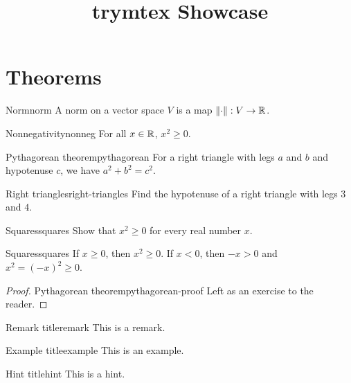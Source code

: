 \documentclass{article}
\title{trymtex Showcase}
\author{}
\date{}
\begin{document}
\maketitle
\tableofcontents

\section{Theorems}

\begin{definition}{Norm}{norm}
  A norm on a vector space \(V\) is a map \( \lVert\cdot\rVert : V \to \mathbb{R} \).
\end{definition}

\begin{lemma}{Nonnegativity}{nonneg}
  For all \( x \in \mathbb{R} \), \( x^2 \ge 0 \).
\end{lemma}

\begin{theorem}{Pythagorean theorem}{pythagorean}
  For a right triangle with legs \(a\) and \(b\) and hypotenuse \(c\), we have \( a^2 + b^2 = c^2 \).
\end{theorem}

\begin{problem}{Right triangles}{right-triangles}
  Find the hypotenuse of a right triangle with legs \(3\) and \(4\).
\end{problem}

\begin{exercise}{Squares}{squares}
  Show that \( x^2 \ge 0 \) for every real number \(x\).
\end{exercise}

\begin{solution}{Squares}{squares}
  If \(x \ge 0\), then \(x^2 \ge 0\). If \(x < 0\), then \(-x > 0\) and \(x^2 = (-x)^2 \ge 0\).
\end{solution}

\begin{proof}{Pythagorean theorem}{pythagorean-proof}
  Left as an exercise to the reader.
\end{proof}

\begin{remark}{Remark title}{remark}
  This is a remark.
\end{remark}

\begin{example}{Example title}{example}
  This is an example.
\end{example}
\begin{hint}{Hint title}{hint}
  This is a hint.
\end{hint}
\end{document}
